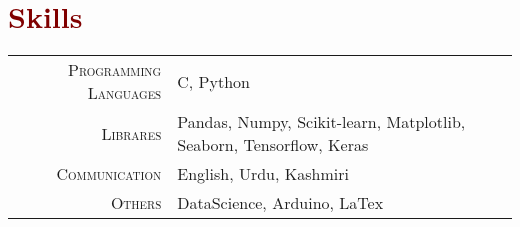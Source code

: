 \documentclass[a4paper,11pt]{article}
\begin{document}
\section{\textcolor{Maroon}{Skills}}
\vspace{3mm}
\begin{tabular}{r|p{16cm}}
\textsc{Programming Languages} & {\normalsize{C, Python}}\vspace{3mm}\\ 
\textsc{Librares} & {\normalsize{Pandas, Numpy, Scikit-learn, Matplotlib, Seaborn, Tensorflow, Keras  }}
\vspace{3mm}\\
\textsc{Communication} & {\normalsize{English, Urdu, Kashmiri }}
\vspace{3mm}\\
\textsc{Others} & {\normalsize{DataScience, Arduino, LaTex }}
\\

\end{tabular}
\end{document}
